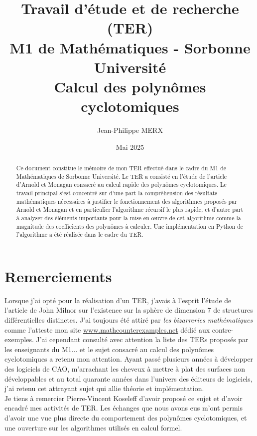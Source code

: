 \documentclass{article}
\theoremstyle{break}                  %
\begin{document}
\lstset{language=python}

\title{Travail d'étude et de recherche (TER)\\
M1 de Mathématiques - Sorbonne Université\\
Calcul des polynômes cyclotomiques}
\author{Jean-Philippe MERX}
\date{Mai 2025}

\maketitle

\begin{abstract}
	Ce document constitue le mémoire de mon TER effectué dans le cadre du M1 de Mathématiques de Sorbonne Université. Le TER a consisté en l'étude de l'article \cite{monagan} d'Arnold et Monagan consacré au calcul rapide des polynômes cyclotomiques. Le travail principal s'est concentré sur d'une part la compréhension des résultats mathématiques nécessaires à justifier le fonctionnement des algorithmes proposés par Arnold et Monagan et en particulier l'algorithme récursif le plus rapide, et d'autre part à analyser des éléments importants pour la mise en œuvre de cet algorithme comme la magnitude des coefficients des polynômes à calculer. Une implémentation en Python de l'algorithme a été réalisée dans le cadre du TER.
\end{abstract}

\section*{Remerciements}
Lorsque j'ai opté pour la réalisation d'un TER, j'avais à l'esprit l'étude de l'article de John Milnor sur l'existence sur la sphère de dimension 7 de structures différentielles distinctes. J'ai toujours été attiré par \emph{les bizarreries mathématiques} comme l'atteste mon site \href{https://www.mathcounterexamples.net/}{www.mathcounterexamples.net} dédié aux contre-exemples. J'ai cependant consulté avec attention la liste des TERs proposés par les enseignants du M1... et le sujet consacré au calcul des polynômes cyclotomiques a retenu mon attention. Ayant passé plusieurs années à développer des logiciels de CAO, m'arrachant les cheveux à mettre à plat des surfaces non développables et au total quarante années dans l'univers des éditeurs de logiciels, j'ai retenu cet attrayant sujet qui allie théorie et implémentation.\\

Je tiens à remercier Pierre-Vincent Koseleff d'avoir proposé ce sujet et d'avoir encadré mes activités de TER. Les échanges que nous avons eus m'ont permis d'avoir une vue plus directe du comportement des polynômes cyclotomiques, et une ouverture sur les algorithmes utilisés en calcul formel.
\end{document}
